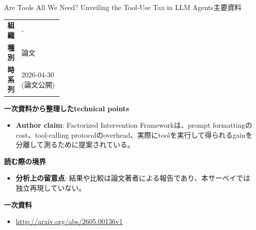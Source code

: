 \begin{technicalnote}{Are Tools All We Need? Unveiling the Tool-Use Tax in LLM Agents}{主要資料}
\begingroup
\begin{tabularx}{\linewidth}{@{}>{\bfseries}p{0.22\linewidth}X@{}}
組織 & - \\
種別 & 論文 \\
時系列 & 2026-04-30 (論文公開) \\
\end{tabularx}
\smallskip
{\bfseries 一次資料から整理したtechnical points}
\begin{itemize}[leftmargin=1.5em,itemsep=0.35em]
\item \textbf{Author claim}: Factorized Intervention Frameworkは、prompt formattingのcost、tool-calling protocolのoverhead、実際にtoolを実行して得られるgainを分離して測るために提案されている。
\end{itemize}
\begin{minipage}{\linewidth}
{\bfseries 読む際の境界}
\begin{itemize}[leftmargin=1.5em,itemsep=0.35em]
\item \textbf{分析上の留意点}: 結果や比較は論文著者による報告であり、本サーベイでは独立再現していない。
\end{itemize}
\begin{samepage}
{\bfseries 一次資料}
\begingroup\sloppy
\begin{itemize}[leftmargin=1.5em,itemsep=0.25em]
\item {\scriptsize\url{http://arxiv.org/abs/2605.00136v1}}
\end{itemize}
\endgroup
\end{samepage}
\end{minipage}
\endgroup
\end{technicalnote}
\medskip
